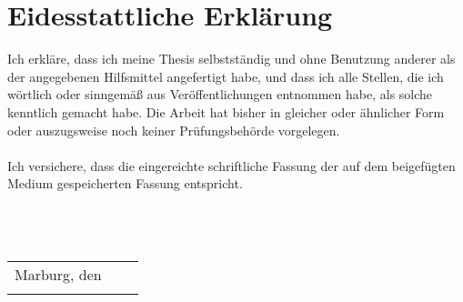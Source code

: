 
{}
\chapter*{Eidesstattliche Erklärung}

Ich erkläre, dass ich meine Thesis \emph{\thesisTitle{}} selbstständig und ohne Benutzung anderer als der angegebenen Hilfsmittel angefertigt habe, und dass ich alle Stellen, die ich wörtlich oder sinngemäß
aus Veröffentlichungen entnommen habe, als solche kenntlich gemacht habe. Die Arbeit hat bisher in gleicher oder ähnlicher Form oder auszugsweise noch keiner Prüfungsbehörde vorgelegen.\\
\\
Ich versichere, dass die eingereichte schriftliche Fassung der auf dem beigefügten Medium gespeicherten Fassung entspricht.\\
\\
\\
\\
\begin{table}[h]
\begin{tabularx}{\columnwidth}{XlX}
Marburg, den \thesisDate{} &  &              \\ \cline{3-3} 
                           &  & \multicolumn{1}{r}{\small{{\thesisAuthor{}}}}
\end{tabularx}
\end{table}
